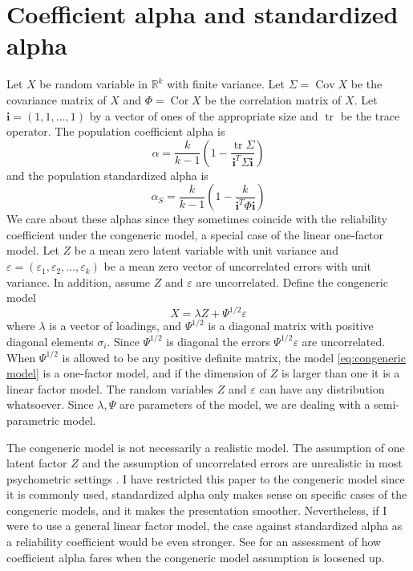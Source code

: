\documentclass[twoside]{article}
\DeclareMathOperator{\tr}{tr}
\DeclareMathOperator{\Cor}{Cor}
\DeclareMathOperator{\Cov}{Cov}
\begin{document}
\section{Coefficient alpha and standardized alpha}
\label{sec:coefficienta alpha}

Let $X$ be random variable in $\mathbb{R}^{k}$ with finite variance.
Let $\Sigma=\Cov X$ be the covariance matrix of $X$ and $\Phi=\Cor X$
be the correlation matrix of $X$. Let $\mathbf{i}=(1,1,\ldots,1)$ by a vector of ones of the appropriate size and $\tr$ be the trace operator.
The population coefficient alpha \citep[][eq. 2]{cronbach1951coefficient} is
\begin{equation}
\alpha =  \frac{k}{k-1}\left(1-\frac{\tr\Sigma}{\mathbf{i}^{T}\Sigma\mathbf{i}}\right)\label{eq:Coefficient alpha}
\end{equation}
and the population standardized alpha \citep[][eq. 2]{Falk2011-ae} is
\begin{equation}
\alpha_S=\frac{k}{k-1}\left(1-\frac{k}{\mathbf{i}^{T}\Phi\mathbf{i}}\right)\label{eq:standardized alpha}
\end{equation}
We care about these alphas since they sometimes coincide with the reliability coefficient under the congeneric model, a special case of the linear one-factor model. Let $Z$ be a mean zero latent variable with unit variance and $\varepsilon=(\varepsilon_{1},\varepsilon_{2},\ldots,\varepsilon_{k})$
be a mean zero vector of uncorrelated errors with unit variance. In addition, assume $Z$ and $\varepsilon$ are uncorrelated. Define the congeneric model
\begin{equation}
X=\lambda Z+\Psi^{1/2}\varepsilon\label{eq:congeneric model}
\end{equation}
where $\lambda$ is a vector of loadings, and $\Psi^{1/2}$ is a diagonal matrix with positive diagonal elements $\sigma_i$. Since $\Psi^{1/2}$ is diagonal the errors $\Psi^{1/2}\varepsilon$ are uncorrelated. When $\Psi^{1/2}$ is allowed to be any positive definite matrix, the model \eqref{eq:congeneric model} is a one-factor model, and if the dimension of $Z$ is larger than one it is a linear factor model. The random variables $Z$ and $\varepsilon$ can have any distribution whatsoever. Since $\lambda,\Psi$ are parameters of the model, we are dealing with a semi-parametric model. 

The congeneric model is not necessarily a realistic model. The assumption of one latent factor $Z$ and the assumption of uncorrelated errors are unrealistic in most psychometric settings \citep[][section 1.2 -- 1.3]{Green2009-le}. I have restricted this paper to the congeneric model since it is commonly used, standardized alpha only makes sense on specific cases of the congeneric models, and it makes the presentation smoother. Nevertheless, if I were to use a general linear factor model, the case against standardized alpha as a reliability coefficient would be even stronger. See \citet[][section 2]{Green2009-le} for an assessment of how coefficient alpha fares when the congeneric model assumption is loosened up.
\end{document}
